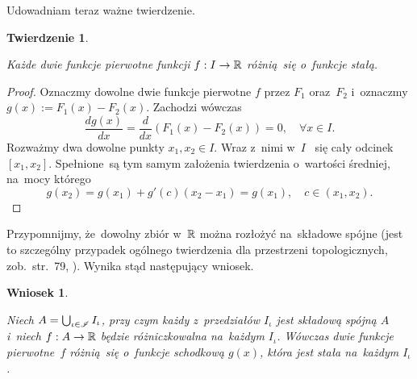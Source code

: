 \documentclass[a4paper,11pt]{article}
\newtheorem{theorem}{Twierdzenie}  %
\newtheorem{corollary}{Wniosek}
\begin{document}
Udowadniam teraz ważne twierdzenie.





\begin{theorem}
  \label{thm:FichtenholzVolII-01}

  Każde dwie funkcje pierwotne funkcji $f: I \to \mathbb{R}$ różnią~się
  o~funkcje stałą.

\end{theorem}



\begin{proof}

  Oznaczmy dowolne dwie funkcje pierwotne $f$ przez $F_{ 1 }$
  oraz~$F_{ 2 }$ i~oznaczmy $g( x ) := F_{ 1 }( x ) - F_{ 2 }( x )$.
  Zachodzi wówczas
  \begin{equation}
    \label{eq:FichtenholzVolII-06}
    \frac{ d g( x ) }{ dx } = \frac{ d }{ dx } ( F_{ 1 }( x ) - F_{ 2 }( x ) )
    = 0, \quad \forall x \in I.
  \end{equation}
  Rozważmy dwa dowolne punkty $x_{ 1 }, x_{ 2 } \in I$. Wraz z~nimi
  w~$I$ ~się cały odcinek $[ x_{ 1 }, x_{ 2 } ]$. Spełnione~są tym
  samym założenia twierdzenia o~wartości średniej, na~mocy którego
  \begin{equation}
    \label{eq:FichtenholzVolII-07}
    g( x_{ 2 } ) = g( x_{ 1 } ) + g'( c ) ( x_{ 2 } - x_{ 1 } )
    = g( x_{ 1 } ), \quad c \in ( x_{ 1 }, x_{ 2 } ).
  \end{equation}

\end{proof}





Przypomnijmy, że~dowolny zbiór w~$\mathbb{R}$ można rozłożyć na~składowe
spójne (jest to szczególny przypadek ogólnego twierdzenia dla
przestrzeni topologicznych, zob.~str.~79,
\cite{SchwartzKursAnalizyMatematycznejVolI1979}). Wynika stąd
następujący wniosek.





\begin{corollary}
  \label{cor:FichtenholzVolII-01}

  Niech $A = \bigcup_{ \iota \in \mathcal{I} } I_{ \iota }$, przy czym każdy z~przedziałów
  $I_{ \iota }$ jest składową spójną $A$ i~niech $f: A \to \mathbb{R}$
  będzie różniczkowalna na~każdym $I_{ \iota }$. Wówczas dwie funkcje
  pierwotne~$f$ różnią~się o~funkcje schodkową $g( x )$, która jest
  stała na~każdym $I_{ \iota }$.

\end{corollary}
\end{document}
